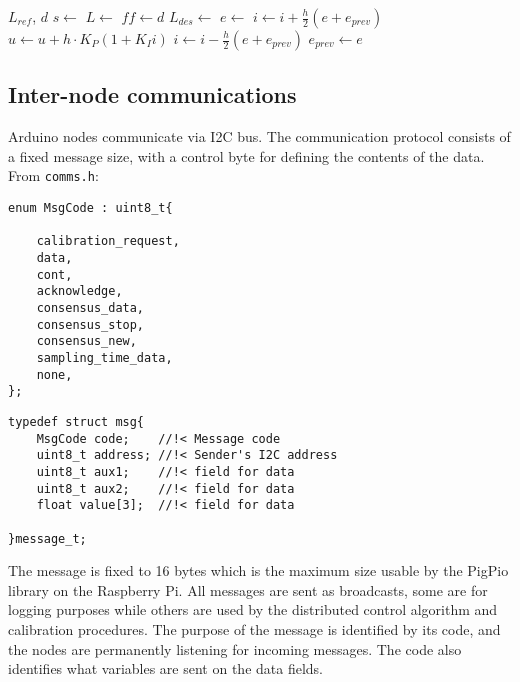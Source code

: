 \documentclass[english,fira]{ist-report}
\begin{document}
\begin{algorithm}[ht]
  \caption{PI + feed-forward control algorithm, called by an interrupt with period \SI{5}{\milli\second}.}
  \label{al:controller}
  \begin{algorithmic}[1]
    \Require $L_{ref}$, $d$
    \State $s \gets $
	\State $L \gets $
	\State $ff \gets d$
	\State $L_{des} \gets $
	\State $e \gets $
	\State $i \gets i + \frac{h}{2}(e+e_{prev})$
	\State $u \gets u + h \cdot K_P (1+K_I i)$
	\State {}  
	     
	    \State $i \gets i - \frac{h}{2}(e+e_{prev})$
	\EndIf
	\State $e_{prev} \gets e$
  \end{algorithmic}
\end{algorithm}

\subsection{Inter-node communications} \label{sec:comms}

Arduino nodes communicate via I2C bus. The communication protocol consists of a fixed message size, with a control byte for defining the contents of the data. From \texttt{comms.h}:
\begin{verbatim}
enum MsgCode : uint8_t{

    calibration_request,
    data,
    cont,
    acknowledge,
    consensus_data,
    consensus_stop,
    consensus_new,
    sampling_time_data,
    none,
};
\end{verbatim}
\begin{verbatim}
typedef struct msg{
    MsgCode code;    //!< Message code
    uint8_t address; //!< Sender's I2C address
    uint8_t aux1;    //!< field for data
    uint8_t aux2;    //!< field for data
    float value[3];  //!< field for data

}message_t;
\end{verbatim}
The message is fixed to 16 bytes which is the maximum size usable by the PigPio library on the Raspberry Pi.
All messages are sent as broadcasts, some are for logging purposes while others are used by the distributed control algorithm and calibration procedures. The purpose of the message is identified by its code, and the nodes are permanently listening for incoming messages. The code also identifies what variables are sent on the data fields.
\end{document}
